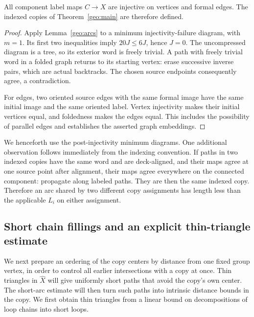 \begin{proposition}[Embeddings]
\label{geo:embeddings}
All component label maps $C\to X$ are injective on vertices and formal
edges.  The indexed copies of Theorem~\ref{geo:main} are therefore defined.
\end{proposition}

\begin{proof}
Apply Lemma~\ref{geo:arcs} to a minimum injectivity-failure diagram, with
$m=1$.  Its first two inequalities imply $20J\le6J$, hence $J=0$.
The uncompressed diagram is a tree, so its exterior word is freely trivial.
A path with freely trivial word in a folded graph returns to its starting
vertex: erase successive inverse pairs, which are actual backtracks.
The chosen source endpoints consequently agree, a contradiction.

For edges, two oriented source edges with the same formal image have the
same initial image and the same oriented label.  Vertex injectivity makes
their initial vertices equal, and foldedness makes the edges equal.
This includes the possibility of parallel edges and establishes the
asserted graph embeddings.
\end{proof}

We henceforth use the post-injectivity minimum diagrams.  One additional
observation follows immediately from the indexing convention.  If paths
in two indexed copies have the same word and are deck-aligned, and their
maps agree at one source point after alignment, their maps agree everywhere
on the connected component: propagate along labeled paths.  They are then
the same indexed copy.  Therefore an arc shared by two different copy
assignments has length less than the applicable $L_i$ on either assignment.
\label{geo:distinct-copy-arcs}

\subsection{Short chain fillings and an explicit thin-triangle estimate}
\label{geo:coned}

We next prepare an ordering of the copy centers by distance from one
fixed group vertex, in order to control all earlier intersections with
a copy at once.  Thin triangles in $\widehat X$ will give uniformly
short paths that avoid the copy's own center.  The short-arc estimate
will then turn such paths into intrinsic distance bounds in the copy.
We first obtain thin triangles from a linear bound on decompositions
of loop chains into short loops.

